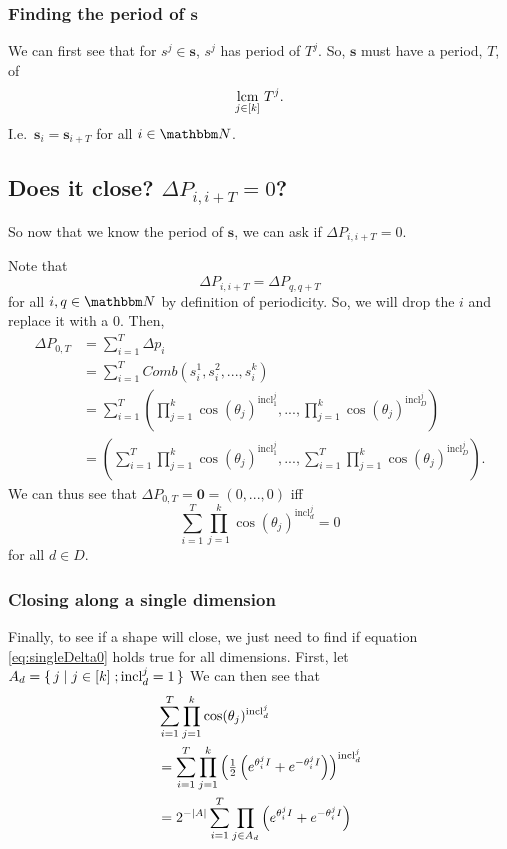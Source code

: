 \documentclass[11pt,titlepage]{article}
\newcommand{\statePeriod}{T^j}
\newcommand{\seedAngle}[1]{{\theta^j_{#1}}}
\newcommand{\stateNotime}[1]{s^{#1}}
\newcommand{\totalPeriod}{T}
\newcommand{\totalStateNotime}{\pmb{s}}
\newcommand{\combWithState}[1]{Comb\left(s^1_{#1}, s^2_{#1}, ..., s^k_{#1}\right)}
\newcommand{\inclIndic}[2]{{\mathrm{incl}_{#1}^{#2}}}
\newcommand{\combSingleTerm}[1]{\prod_{j=1}^k \cos(\theta_j) ^ {\inclIndic{#1}{j}}}
\begin{document}
\subsubsection{Finding the period of $\pmb{s}$}
We can first see that for $\stateNotime{j} \in \pmb{s}$, $\stateNotime{j}$
has period of $\statePeriod$. So, $\pmb{s}$ must have a period, $\totalPeriod$, of
$$
\underset{j \in [k]}{\operatorname{lcm}}\; T^j.
$$
I.e.\ $\pmb{s}_i = \pmb{s}_{i + T}$ for all $i \in \N$.







\subsection{Does it close? $\Delta P_{i, i + T} = 0$?}
So now that we know the period of $\totalStateNotime$, we can ask if
$\Delta P_{i, i + T} = 0$. %

Note that 
$$
\Delta P_{i, i + T} = \Delta P_{q, q + T}
$$
for all $i, q \in \N$ by definition of periodicity.
So, we will drop the $i$ and replace it with a $0$.
Then,
\begin{align*}
  \Delta P_{0, T} &= \sum_{i = 1}^T \Delta p_i \\
  &= \sum_{i = 1}^T \combWithState{i} \\
  &= \sum_{i = 1}^T \left(\combSingleTerm{1}, ..., \combSingleTerm{D}\right) \\
  &= \left(\sum_{i = 1}^T \combSingleTerm{1}, ..., \sum_{i = 1}^T \combSingleTerm{D}\right).
\end{align*}
We can thus see that $\Delta P_{0, T} = \pmb{0} = (0, ..., 0)$ iff 
\begin{equation}
\label{eq:singleDelta0}
\sum_{i = 1}^T \combSingleTerm{d} = 0
\end{equation}
for all $d \in D$.

\subsubsection{Closing along a single dimension}
Finally, to see if a shape will close,
we just need to find if equation \eqref{eq:singleDelta0} holds true for all dimensions.
First, let $A_d = \set{j \mid j \in [k] \; ; \inclIndic{d}{j} = 1}$
We can then see that
\begin{align*}
&\sum_{i = 1}^T \combSingleTerm{d}\\
&=\sum_{i = 1}^T \prod_{j = 1}^k \left(\half \left(e^{\seedAngle{i} I} +  e^{-\seedAngle{i} I}\right)\right)^\inclIndic{d}{j}\\
&=2^{-|A|} \sum_{i = 1}^T \prod_{j \in A_d} \left(e^{\seedAngle{i} I} +  e^{-\seedAngle{i} I}\right)\\
\end{align*}
\end{document}
